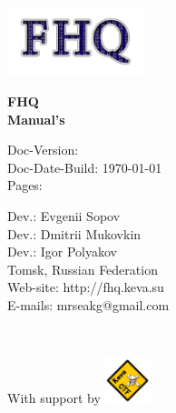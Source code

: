 \begin{titlepage}

\noindent
\begin{flushright}
\includegraphics[width=0.3\textwidth]{./img/logo}~
\\[3cm]
\end{flushright}

\begin{center}
{ \huge \bfseries  FHQ \\ Manual's \\[2cm] }
\end{center}

\noindent
\begin{minipage}{0.4\textwidth}
\begin{flushleft}
Doc-Version:  \\
Doc-Date-Build: \today \\
Pages: \pageref{LastPage} \\
\end{flushleft}
\end{minipage}%

\vfill


\noindent
\begin{minipage}{0.5\textwidth}
\begin{flushleft}
Dev.: Evgenii Sopov \\
Dev.: Dmitrii Mukovkin \\
Dev.: Igor Polyakov \\
Tomsk, Russian Federation \\[0.4cm]
Web-site: http://fhq.keva.su \\
E-mails: mrseakg@gmail.com \\

\end{flushleft}
\end{minipage}%
\\[1cm]

\noindent

\begin{minipage}{1.0\textwidth}
\begin{flushright}
With support by
\includegraphics[width=0.1\textwidth]{./img/keva}~
\end{flushright}
\end{minipage}%

\end{titlepage}
